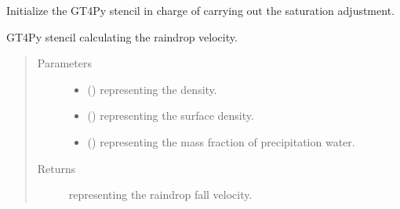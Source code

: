 \documentclass[letterpaper,10pt,english]{sphinxmanual}
\begin{document}
\begin{fulllineitems}
\begin{fulllineitems}
\end{fulllineitems}


\begin{fulllineitems}
\label{\detokenize{api:tasmania.parameterizations.adjustment_microphysics_kessler_wrf_saturation.AdjustmentMicrophysicsKesslerWRFSaturation._stencil_adjustment_initialize}}
Initialize the GT4Py stencil in charge of carrying out the saturation adjustment.

\end{fulllineitems}


\begin{fulllineitems}
\label{\detokenize{api:tasmania.parameterizations.adjustment_microphysics_kessler_wrf_saturation.AdjustmentMicrophysicsKesslerWRFSaturation._stencil_raindrop_fall_velocity_defs}}
GT4Py stencil calculating the raindrop velocity.
\begin{quote}\begin{description}
\item[{Parameters}] \leavevmode\begin{itemize}
\item {} 
 () \textendash{}  representing the density.

\item {} 
 () \textendash{}  representing the surface density.

\item {} 
 () \textendash{}  representing the mass fraction of precipitation water.

\end{itemize}

\item[{Returns}] \leavevmode
{} representing the raindrop fall velocity.


\end{description}
\end{quote}
\end{fulllineitems}
\end{fulllineitems}
\end{document}

